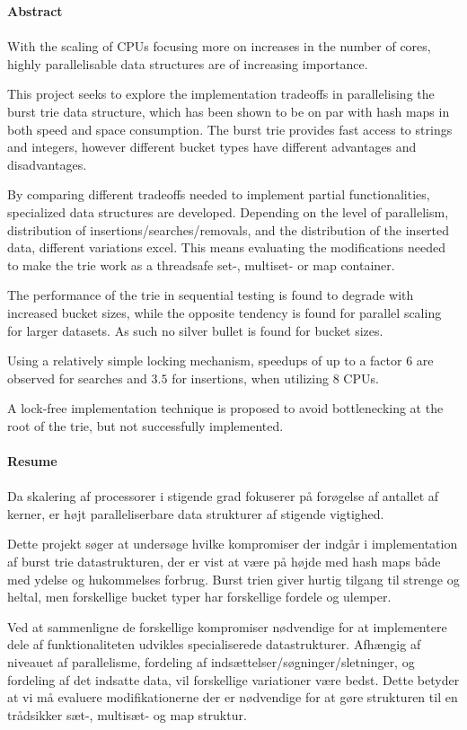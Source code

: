 \noindent
{\bf Abstract}
\\\\
With the scaling of CPUs focusing more on increases in the number of cores,
highly parallelisable data structures are of increasing importance.

This project seeks to explore the implementation tradeoffs in parallelising the
burst trie data structure, which has been shown to be on par with hash maps in
both speed and space consumption. The burst trie provides fast access to
strings and integers, however different bucket types have different advantages
and disadvantages.

By comparing different tradeoffs needed to implement partial functionalities,
specialized data structures are developed. Depending on the level of
parallelism, distribution of insertions/searches/removals, and the
distribution of the inserted data, different variations excel. This means
evaluating the modifications needed to make the trie work as a threadsafe set-,
multiset- or map container.

The performance of the trie in sequential testing is found to degrade with
increased bucket sizes, while the opposite tendency is found for parallel
scaling for larger datasets. As such no silver bullet is found for bucket
sizes.

Using a relatively simple locking mechanism, speedups of up to a factor $6$ are
observed for searches and $3.5$ for insertions, when utilizing 8 CPUs.

A lock-free implementation technique is proposed to avoid bottlenecking at the
root of the trie, but not successfully implemented.
\\\\
{\bf Resume}
\\\\
Da skalering af processorer i stigende grad fokuserer på forøgelse af antallet af
kerner, er højt paralleliserbare data strukturer af stigende vigtighed.

Dette projekt søger at undersøge hvilke kompromiser der indgår i implementation
af burst trie datastrukturen, der er vist at være på højde med hash maps
både med ydelse og hukommelses forbrug. Burst trien giver hurtig tilgang til
strenge og heltal, men forskellige bucket typer har forskellige fordele og ulemper.

Ved at sammenligne de forskellige kompromiser nødvendige for at implementere dele
af funktionaliteten udvikles specialiserede datastrukturer. Afhængig af niveauet
af parallelisme, fordeling af indsættelser/søgninger/sletninger, og fordeling
af det indsatte data, vil forskellige variationer være bedst. Dette betyder at
vi må evaluere modifikationerne der er nødvendige for at gøre strukturen til
en trådsikker sæt-, multisæt- og map struktur.

